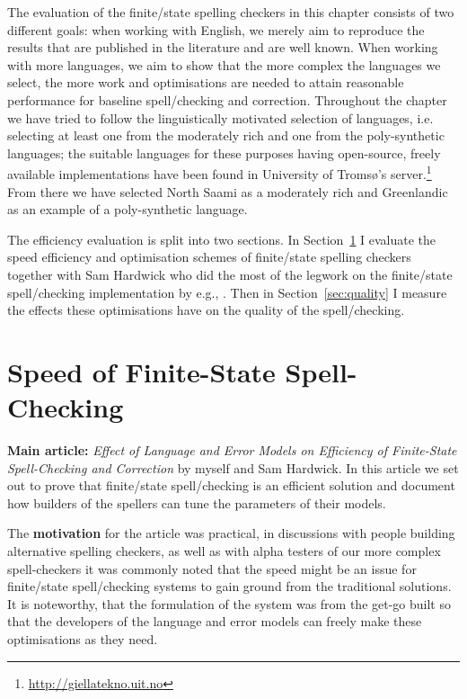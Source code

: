 \documentclass[officiallayout]{unihelcompling}
\begin{document}
The evaluation of the finite\-/state spelling checkers in this chapter consists
of two different goals: when working with English, we merely aim to reproduce
the results that are published in the literature and are well known. When
working with more 
languages, we aim to show that the more complex the languages we select, the
more work and optimisations are needed to attain reasonable performance for
baseline spell\-/checking and correction.  Throughout the chapter we have tried
to follow the linguistically motivated selection of languages, i.e. selecting
at least one from the moderately rich and one from the poly-synthetic
languages; the suitable languages for these purposes having open-source, freely
available implementations have been found in University of Tromsø's
server.\footnote{\url{http://giellatekno.uit.no}} From there we have selected
North Saami as a moderately rich and Greenlandic as an example of a
poly-synthetic language.

The efficiency evaluation is split into two sections. In
Section~\ref{sec:speed} I evaluate the speed efficiency and optimisation
schemes of finite\-/state spelling checkers together with Sam Hardwick who did
the most of the legwork on the finite\-/state spell\-/checking implementation
by e.g.,  \citep{linden2011hfst}. Then in Section~\ref{sec:quality} I measure
the effects these optimisations have on the quality of the spell\-/checking.

\section{Speed of Finite-State Spell-Checking}
\label{sec:speed}

\textbf{Main article:} \emph{Effect of Language and Error Models on Efficiency
of Finite-State Spell-Checking and Correction} by myself and Sam Hardwick. In
this article we set out to prove that finite\-/state spell\-/checking is an
efficient solution and document how builders of the spellers can tune the
parameters of their models.

The \textbf{motivation} for the article was practical, in discussions with
people building alternative spelling checkers, as well as with alpha testers of
our more complex spell-checkers it was commonly noted that the speed might be
an issue for finite\-/state spell\-/checking systems to gain ground from the
traditional solutions. It is noteworthy, that the formulation of the system was
from the get-go built so that the developers of the language and error models
can freely make these optimisations as they need.
\end{document}
